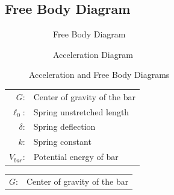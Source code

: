 \documentclass[12pt]{report}
\begin{document}
\begin{flushleft}
\section{Free Body Diagram}
\begin{figure}[!htp]
   \begin{minipage}[c]{.5\textwidth}
     \begin{subfigure}{\textwidth}
       \caption{Free Body Diagram}
       \center
      
      \end{subfigure}
   \end{minipage}%
   \begin{minipage}[c]{.5\textwidth}
     \begin{subfigure}{\textwidth}
       \caption{Acceleration Diagram}
       \center
       
    \end{subfigure}
   \end{minipage}
   \caption{Acceleration and Free Body Diagrams}
\end{figure}
\begin{minipage}[c]{.5\textwidth}
  \center
  \begin{tabular}{rl}
  $G$:&Center of gravity of the bar\\
  $\ell_0$:& Spring unstretched length \\
  $\delta$:& Spring deflection \\
  $k$:& Spring constant \\
  $V_{bar}$:& Potential energy of bar \\
\end{tabular}
\end{minipage}%
\begin{minipage}[c]{.5\textwidth}
 \center
 \begin{tabular}{rl}
 $G$:&Center of gravity of the bar\\
\end{tabular}
\end{minipage}
\newpage


\end{flushleft}
\end{document}
